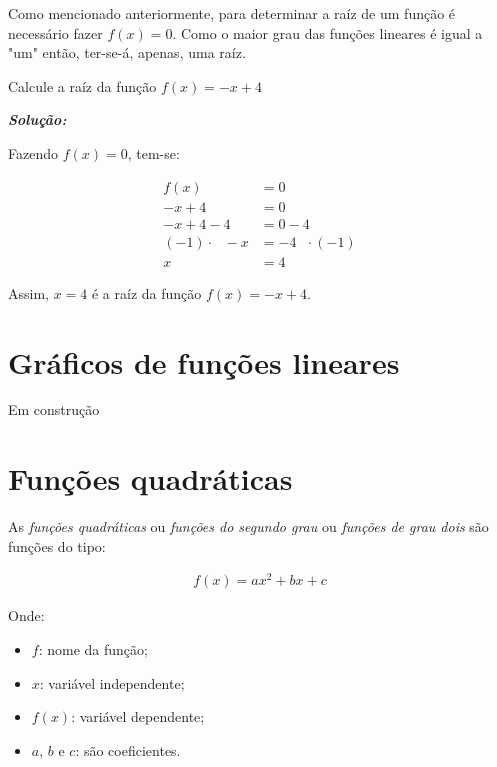 Como mencionado anteriormente, para determinar a raíz de um função é necessário fazer $f(x)=0$. Como o maior grau das funções lineares é igual a "um" então, ter-se-á, apenas, uma raíz.

\begin{example} Calcule a raíz da função $f(x)=-x+4$
	
	\textit{\textbf{Solução:}}
	
	Fazendo $f(x)=0$, tem-se:
	\begin{ceqn}
		\begin{align*}
		f(x)&=0 \\
		-x+4&=0 \\
		-x+4-4&=0-4 \\
		(-1) \cdot \,\,\,\, -x&=-4\,\,\,\, \cdot (-1) \\
		x&=4
		\end{align*}
	\end{ceqn}
	
	Assim, $x=4$ é a raíz da função $f(x)=-x+4$.
\end{example}

\section{Gráficos de funções lineares}

Em construção

\section{Funções quadráticas}

As \textit{funções quadráticas} ou \textit{funções do segundo grau} ou \textit{funções de grau dois} são funções do tipo:

\begin{ceqn}
	\begin{align*}
	f(x) = ax^2 +bx+c
	\end{align*}
\end{ceqn}

\vspace{.5cm}
Onde:
\begin{itemize}
	\item{$f$: nome da função;}
	\item{$x$: variável independente;}
	\item{$f(x)$: variável dependente;}
	\item{$a$, $b$ e $c$: são coeficientes.}
\end{itemize}

